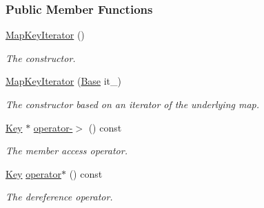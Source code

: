 \subsubsection*{Public Member Functions}
\begin{DoxyCompactItemize}
\item 
\hyperlink{structslb_1_1core_1_1util_1_1MapKeyIterator_ab8c03749f09615e90100892e85d868ef}{Map\+Key\+Iterator} ()\hypertarget{structslb_1_1core_1_1util_1_1MapKeyIterator_ab8c03749f09615e90100892e85d868ef}{}\label{structslb_1_1core_1_1util_1_1MapKeyIterator_ab8c03749f09615e90100892e85d868ef}

\begin{DoxyCompactList}\small\item\em The constructor. \end{DoxyCompactList}\item 
\hyperlink{structslb_1_1core_1_1util_1_1MapKeyIterator_a752cbce70f60c159e29f36b7fb1f6163}{Map\+Key\+Iterator} (\hyperlink{structslb_1_1core_1_1util_1_1MapKeyIterator_adf1ce94c1b6db468be0ff8c55e41d80d}{Base} it\+\_\+)\hypertarget{structslb_1_1core_1_1util_1_1MapKeyIterator_a752cbce70f60c159e29f36b7fb1f6163}{}\label{structslb_1_1core_1_1util_1_1MapKeyIterator_a752cbce70f60c159e29f36b7fb1f6163}

\begin{DoxyCompactList}\small\item\em The constructor based on an iterator of the underlying map. \end{DoxyCompactList}\item 
\hyperlink{structslb_1_1core_1_1util_1_1MapKeyIterator_af550172a5aa06744fc3ad0b18c499a59}{Key} $\ast$ \hyperlink{structslb_1_1core_1_1util_1_1MapKeyIterator_a578e66dc487cb0899079ec02e8fe55e4}{operator-\/$>$} () const 
\begin{DoxyCompactList}\small\item\em The member access operator. \end{DoxyCompactList}\item 
\hyperlink{structslb_1_1core_1_1util_1_1MapKeyIterator_af550172a5aa06744fc3ad0b18c499a59}{Key} \hyperlink{structslb_1_1core_1_1util_1_1MapKeyIterator_a46eec9507ea0b949bbdde6f41236b989}{operator$\ast$} () const 
\begin{DoxyCompactList}\small\item\em The dereference operator. \end{DoxyCompactList}\end{DoxyCompactItemize}


